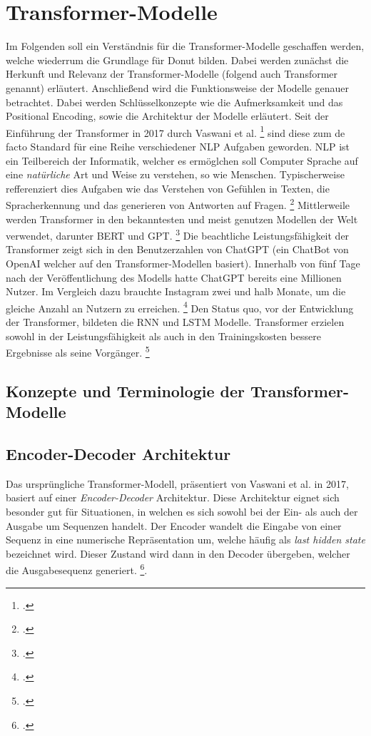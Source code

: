 \section{Transformer-Modelle}
Im Folgenden soll ein Verständnis für die Transformer-Modelle geschaffen werden, welche wiederrum die Grundlage für Donut bilden. Dabei werden zunächst die Herkunft und Relevanz der Transformer-Modelle (folgend auch Transformer genannt) erläutert. Anschließend wird die Funktionsweise der Modelle genauer betrachtet. Dabei werden Schlüsselkonzepte wie die Aufmerksamkeit und das Positional Encoding, sowie die Architektur der Modelle erläutert. Seit der Einführung der Transformer in 2017 durch Vaswani et al. \footcites{vaswani_attention_2017} sind diese zum de facto Standard für eine Reihe verschiedener \ac{NLP} Aufgaben geworden. \ac{NLP} ist ein Teilbereich der Informatik, welcher es ermöglchen soll Computer Sprache auf eine \emph{natürliche} Art und Weise zu verstehen, so wie Menschen. Typischerweise refferenziert dies Aufgaben wie das Verstehen von Gefühlen in Texten, die Spracherkennung und das generieren von Antworten auf Fragen. \footcites[Vgl.][S.1]{beysolow_ii_applied_2018} Mittlerweile werden Transformer in den bekanntesten und meist genutzen Modellen der Welt verwendet, darunter BERT und GPT. \footcites[Vgl.][S. 1]{tunstall_natural_2022} Die beachtliche Leistungsfähigkeit der Transformer zeigt sich in den Benutzerzahlen von ChatGPT (ein ChatBot von OpenAI welcher auf den Transformer-Modellen basiert). Innerhalb von fünf Tage nach der Veröffentlichung des Modells hatte ChatGPT bereits eine Millionen Nutzer. Im Vergleich dazu brauchte Instagram zwei und halb Monate, um die gleiche Anzahl an Nutzern zu erreichen. \footcites[Vgl.][]{buchholz_infographic_2023} Den Status quo, vor der Entwicklung der Transformer, bildeten die \ac{RNN} und \ac{LSTM} Modelle. Transformer erzielen sowohl in der Leistungsfähigkeit als auch in den Trainingskosten bessere Ergebnisse als seine Vorgänger. \footcites[Vgl.][S. 1]{tunstall_natural_2022}

\subsection{Konzepte und Terminologie der Transformer-Modelle}

\subsection{Encoder-Decoder Architektur}
Das ursprüngliche Transformer-Modell, präsentiert von Vaswani et al. in 2017, basiert auf einer \emph{Encoder-Decoder} Architektur. Diese Architektur eignet sich besonder gut für Situationen, in welchen es sich sowohl bei der Ein- als auch der Ausgabe um Sequenzen handelt. Der Encoder wandelt die Eingabe von einer Sequenz in eine numerische Repräsentation um, welche häufig als \emph{last hidden state} bezeichnet wird. Dieser Zustand wird dann in den Decoder übergeben, welcher die Ausgabesequenz generiert. \footcites[Vgl.][S. 3]{tunstall_natural_2022}.

